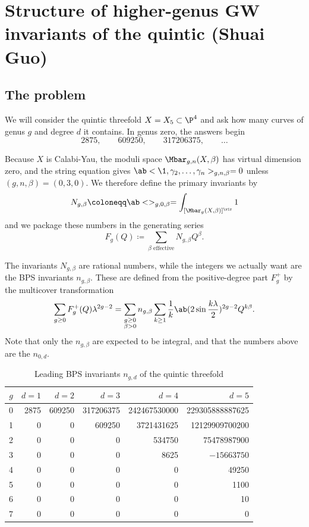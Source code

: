 \section{Structure of higher-genus GW invariants of the quintic (Shuai Guo)}%
\label{sec:Structure of higher-genus GW invariants of the quintic (Shuai Guo)}

\subsection{The problem}%
\label{sub:The problem (Guo)}

We will consider the quintic threefold \(X = X_5 \subset \P^4\) and ask how many curves of genus \(g\) and degree \(d\) it contains. In genus zero, the answers begin
\[ 2875, \qquad 609250, \qquad 317206375, \qquad \ldots \]

Because \(X\) is Calabi-Yau, the moduli space \(\Mbar_{g,n}(X,\beta)\) has virtual dimension zero, and the string equation gives \(\ab<\1, \gamma_2, \ldots, \gamma_n>_{g,n,\beta} = 0\) unless \((g,n,\beta) = (0,3,0)\). We therefore define the primary invariants by
\[ N_{g,\beta} \coloneqq \ab<>_{g,0,\beta} = \int_{[\Mbar_g(X,\beta)]^{\vir}} 1 \]
and we package these numbers in the generating series
\[ F_g(Q) \coloneqq \sum_{\beta \text{ effective}} N_{g,\beta}Q^{\beta}. \]

The invariants \(N_{g,\beta}\) are rational numbers, while the integers we actually want are the BPS invariants \(n_{g,\beta}\). These are defined from the positive-degree part \(F_g^+\) by the multicover transformation
\[ \sum_{g \geq 0} F_g^+(Q)\lambda^{2g-2} = \sum_{\substack{g \geq 0 \\ \beta > 0}} n_{g,\beta} \sum_{k \geq 1} \frac{1}{k} \ab(2 \sin \frac{k\lambda}{2})^{2g-2}Q^{k\beta}. \]
Note that only the \(n_{g,\beta}\) are expected to be integral, and that the numbers above are the \(n_{0,d}\).

\begin{table}[htpb]
    \centering
    \caption{Leading BPS invariants \(n_{g,d}\) of the quintic threefold}
    \label{tab:quinticbps}
    \begin{tabular}{crrrrr}
        \toprule
        \(g\) & \(d=1\) & \(d=2\) & \(d=3\) & \(d=4\) & \(d=5\) \\
        \midrule
        0 & 2875 & 609250 & 317206375 & 242467530000 & 229305888887625 \\
        1 & 0 & 0 & 609250 & 3721431625 & 12129909700200 \\
        2 & 0 & 0 & 0 & 534750 & 75478987900 \\
        3 & 0 & 0 & 0 & 8625 & \(-15663750\) \\
        4 & 0 & 0 & 0 & 0 & 49250 \\
        5 & 0 & 0 & 0 & 0 & 1100 \\
        6 & 0 & 0 & 0 & 0 & 10 \\
        7 & 0 & 0 & 0 & 0 & 0 \\
        \bottomrule
    \end{tabular}
\end{table}

